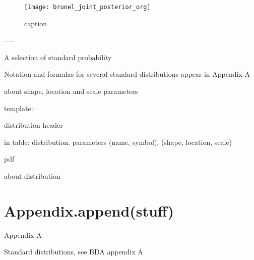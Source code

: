 \begin{figure}[H]
    \centering
    \texttt{[image: brunel\_joint\_posterior\_org]}
    \caption{caption}
    \label{fig:fig1}
\end{figure} 

----


A selection of standard probability 

Notation and formulas for several standard distributions appear in Appendix A 


about shape, location and scale parameters

template: 

distribution header

in table: 
distribution, parameters 
(name, symbol), (shape, location, scale)

pdf

about distribution


\section{Appendix.append(stuff)}

Appendix A

Standard distributions, see BDA appendix A

